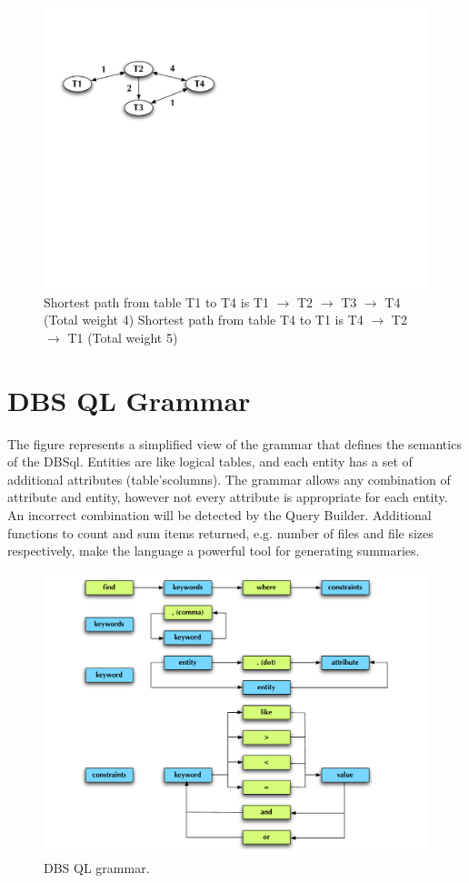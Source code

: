 \documentclass[a4paper]{jpconf}
\begin{document}
\begin{figure}[htb]
\centering
\includegraphics[width=150mm]{DBSSql_shortestpath.pdf}
\caption{
Shortest path from table T1 to T4 is 
T1 $\rightarrow$ T2 $\rightarrow$ T3 $\rightarrow$ T4  (Total weight 4) 
Shortest path from table T4 to T1 is 
T4 $\rightarrow$ T2 $\rightarrow$ T1 (Total weight 5) 
}
\label{ShortestPath}
\end{figure}

\section{DBS QL Grammar}


The figure represents a simplified view of the grammar
that defines the semantics of the DBSql. Entities are
like logical tables, and each entity has a set of additional 
attributes (table’scolumns). The grammar allows any 
combination of attribute and entity, however not 
every attribute is appropriate for each entity.
An incorrect combination will be detected by the Query Builder. 
Additional functions to count and sum items returned, e.g.
number of files and file sizes respectively,
make the language a powerful tool for generating
summaries. 

\begin{figure}[htb]
\centering
\includegraphics[width=150mm]{DBSSql_grammar.pdf}
\caption{
DBS QL grammar.
}
\label{ShortestPath}
\end{figure}
\end{document}
